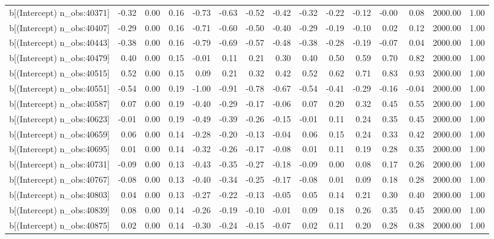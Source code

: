 \begin{table}[ht]
\begin{tabular}{rrrrrrrrrrrrrrr}
  b[(Intercept) n\_obs:40371] & -0.32 & 0.00 & 0.16 & -0.73 & -0.63 & -0.52 & -0.42 & -0.32 & -0.22 & -0.12 & -0.00 & 0.08 & 2000.00 & 1.00 \\ 
  b[(Intercept) n\_obs:40407] & -0.29 & 0.00 & 0.16 & -0.71 & -0.60 & -0.50 & -0.40 & -0.29 & -0.19 & -0.10 & 0.02 & 0.12 & 2000.00 & 1.00 \\ 
  b[(Intercept) n\_obs:40443] & -0.38 & 0.00 & 0.16 & -0.79 & -0.69 & -0.57 & -0.48 & -0.38 & -0.28 & -0.19 & -0.07 & 0.04 & 2000.00 & 1.00 \\ 
  b[(Intercept) n\_obs:40479] & 0.40 & 0.00 & 0.15 & -0.01 & 0.11 & 0.21 & 0.30 & 0.40 & 0.50 & 0.59 & 0.70 & 0.82 & 2000.00 & 1.00 \\ 
  b[(Intercept) n\_obs:40515] & 0.52 & 0.00 & 0.15 & 0.09 & 0.21 & 0.32 & 0.42 & 0.52 & 0.62 & 0.71 & 0.83 & 0.93 & 2000.00 & 1.00 \\ 
  b[(Intercept) n\_obs:40551] & -0.54 & 0.00 & 0.19 & -1.00 & -0.91 & -0.78 & -0.67 & -0.54 & -0.41 & -0.29 & -0.16 & -0.04 & 2000.00 & 1.00 \\ 
  b[(Intercept) n\_obs:40587] & 0.07 & 0.00 & 0.19 & -0.40 & -0.29 & -0.17 & -0.06 & 0.07 & 0.20 & 0.32 & 0.45 & 0.55 & 2000.00 & 1.00 \\ 
  b[(Intercept) n\_obs:40623] & -0.01 & 0.00 & 0.19 & -0.49 & -0.39 & -0.26 & -0.15 & -0.01 & 0.11 & 0.24 & 0.35 & 0.45 & 2000.00 & 1.00 \\ 
  b[(Intercept) n\_obs:40659] & 0.06 & 0.00 & 0.14 & -0.28 & -0.20 & -0.13 & -0.04 & 0.06 & 0.15 & 0.24 & 0.33 & 0.42 & 2000.00 & 1.00 \\ 
  b[(Intercept) n\_obs:40695] & 0.01 & 0.00 & 0.14 & -0.32 & -0.26 & -0.17 & -0.08 & 0.01 & 0.11 & 0.19 & 0.28 & 0.35 & 2000.00 & 1.00 \\ 
  b[(Intercept) n\_obs:40731] & -0.09 & 0.00 & 0.13 & -0.43 & -0.35 & -0.27 & -0.18 & -0.09 & 0.00 & 0.08 & 0.17 & 0.26 & 2000.00 & 1.00 \\ 
  b[(Intercept) n\_obs:40767] & -0.08 & 0.00 & 0.13 & -0.40 & -0.34 & -0.25 & -0.17 & -0.08 & 0.01 & 0.09 & 0.18 & 0.28 & 2000.00 & 1.00 \\ 
  b[(Intercept) n\_obs:40803] & 0.04 & 0.00 & 0.13 & -0.27 & -0.22 & -0.13 & -0.05 & 0.05 & 0.14 & 0.21 & 0.30 & 0.40 & 2000.00 & 1.00 \\ 
  b[(Intercept) n\_obs:40839] & 0.08 & 0.00 & 0.14 & -0.26 & -0.19 & -0.10 & -0.01 & 0.09 & 0.18 & 0.26 & 0.35 & 0.45 & 2000.00 & 1.00 \\ 
  b[(Intercept) n\_obs:40875] & 0.02 & 0.00 & 0.14 & -0.30 & -0.24 & -0.15 & -0.07 & 0.02 & 0.11 & 0.20 & 0.28 & 0.38 & 2000.00 & 1.00 \\ 

\end{tabular}
\end{table}
